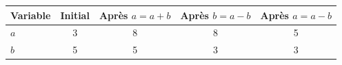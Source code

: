 \begingroup\renewcommand{\arraystretch}{1.35}
\small
\begin{tabular}{@{}lcccc@{}}\toprule
Variable & Initial & Après $a=a+b$ & Après $b=a-b$ & Après $a=a-b$\\\midrule
$a$ & 3 & 8 & 8 & 5\\
$b$ & 5 & 5 & 3 & 3\\
\bottomrule\end{tabular}\endgroup

\par\smallskip{}
